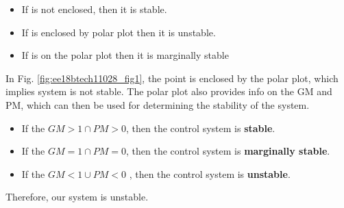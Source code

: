 \begin{enumerate}[label=\thesubsection.\arabic*.,ref=\thesubsection.\theenumi]
\begin{itemize}
    \item If   is not enclosed, then it is stable.
    \item If  is enclosed by polar plot then it is unstable. 
    \item If  is on the polar plot then it is marginally stable
    
    
\end{itemize}
In Fig. \ref{fig:ee18btech11028_fig1},  the point  is enclosed by the polar plot,
which implies system is not stable.  The polar plot also provides info on the GM and PM, which can then be used for determining the stability of the system.

\begin{itemize}
    \item If the $GM > 1 \cap PM > 0$,  then the control system is \textbf{stable}.
    \item If the $GM = 1\cap PM =0 $,  then the control system is  \textbf{marginally stable}.
    \item If the $GM < 1\cup  PM < 0$ , then the control system is \textbf{unstable}.
\end{itemize}

Therefore, our system is unstable.



\end{enumerate}
